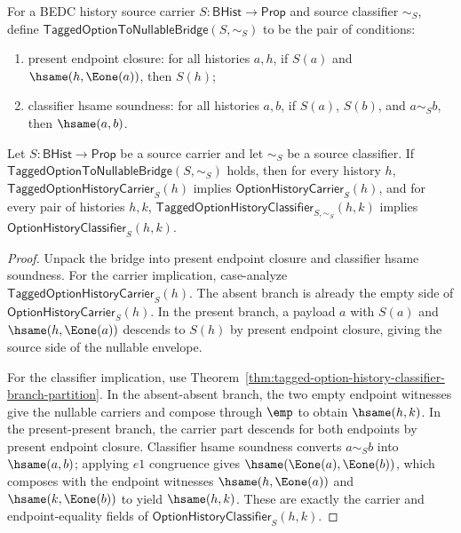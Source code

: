 \begin{definition}
\label{def:tagged-option-to-nullable-bridge-hypotheses}
For a BEDC history source carrier $S:\mathsf{BHist}\to\mathsf{Prop}$ and source
classifier $\sim_S$, define
$\mathsf{TaggedOptionToNullableBridge}(S,\sim_S)$ to be the pair of conditions:
\begin{enumerate}
  \item present endpoint closure: for all histories $a,h$, if $S(a)$ and $\hsame(h,\Eone(a))$, then $S(h)$;
  \item classifier hsame soundness: for all histories $a,b$, if $S(a)$, $S(b)$, and $a\sim_S b$, then $\hsame(a,b)$.
\end{enumerate}
\end{definition}

\begin{theorem}
\label{thm:tagged-option-to-nullable-classifier-bridge}
Let $S:\mathsf{BHist}\to\mathsf{Prop}$ be a source carrier and let $\sim_S$ be a
source classifier. If $\mathsf{TaggedOptionToNullableBridge}(S,\sim_S)$ holds,
then for every history $h$,
$\mathsf{TaggedOptionHistoryCarrier}_S(h)$ implies
$\mathsf{OptionHistoryCarrier}_S(h)$, and for every pair of histories $h,k$,
$\mathsf{TaggedOptionHistoryClassifier}_{S,\sim_S}(h,k)$ implies
$\mathsf{OptionHistoryClassifier}_S(h,k)$.
\end{theorem}
\begin{proof}
Unpack the bridge into present endpoint closure and classifier hsame soundness.
For the carrier implication, case-analyze
$\mathsf{TaggedOptionHistoryCarrier}_S(h)$. The absent branch is already the
empty side of $\mathsf{OptionHistoryCarrier}_S(h)$. In the present branch, a
payload $a$ with $S(a)$ and $\hsame(h,\Eone(a))$ descends to $S(h)$ by present
endpoint closure, giving the source side of the nullable envelope.

For the classifier implication, use
Theorem~\ref{thm:tagged-option-history-classifier-branch-partition}. In the
absent-absent branch, the two empty endpoint witnesses give the nullable
carriers and compose through $\emp$ to obtain $\hsame(h,k)$. In the
present-present branch, the carrier part descends for both endpoints by present
endpoint closure. Classifier hsame soundness converts $a\sim_S b$ into
$\hsame(a,b)$; applying $e1$ congruence gives
$\hsame(\Eone(a),\Eone(b))$, which composes with the endpoint witnesses
$\hsame(h,\Eone(a))$ and $\hsame(k,\Eone(b))$ to yield $\hsame(h,k)$. These are
exactly the carrier and endpoint-equality fields of
$\mathsf{OptionHistoryClassifier}_S(h,k)$.
\end{proof}

